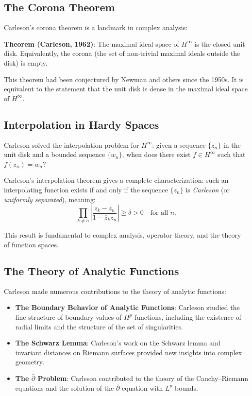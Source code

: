 \subsection{The Corona Theorem}

Carleson's corona theorem is a landmark in complex analysis:

\textbf{Theorem (Carleson, 1962)}: The maximal ideal space of $H^\infty$ is the closed unit disk. Equivalently, the corona (the set of non-trivial maximal ideals outside the disk) is empty.

This theorem had been conjectured by Newman and others since the 1950s. It is equivalent to the statement that the unit disk is dense in the maximal ideal space of $H^\infty$.

\subsection{Interpolation in Hardy Spaces}

Carleson solved the interpolation problem for $H^\infty$: given a sequence $\{z_n\}$ in the unit disk and a bounded sequence $\{w_n\}$, when does there exist $f \in H^\infty$ such that $f(z_n) = w_n$?

Carleson's interpolation theorem gives a complete characterization: such an interpolating function exists if and only if the sequence $\{z_n\}$ is \emph{Carleson} (or \emph{uniformly separated}), meaning:
\[
\prod_{k \neq n} \left| \frac{z_k - z_n}{1 - \overline{z}_k z_n} \right| \geq \delta > 0 \quad \text{for all } n.
\]

This result is fundamental to complex analysis, operator theory, and the theory of function spaces.

\subsection{The Theory of Analytic Functions}

Carleson made numerous contributions to the theory of analytic functions:

\begin{itemize}
\item \textbf{The Boundary Behavior of Analytic Functions}: Carleson studied the fine structure of boundary values of $H^p$ functions, including the existence of radial limits and the structure of the set of singularities.

\item \textbf{The Schwarz Lemma}: Carleson's work on the Schwarz lemma and invariant distances on Riemann surfaces provided new insights into complex geometry.

\item \textbf{The $\bar\partial$ Problem}: Carleson contributed to the theory of the Cauchy--Riemann equations and the solution of the $\bar\partial$ equation with $L^p$ bounds.
\end{itemize}

